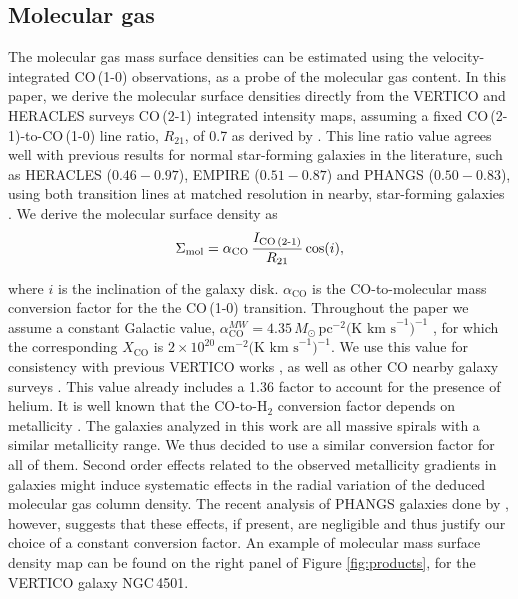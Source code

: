 \documentclass[longauth]{aa}
\begin{document}
\subsection{Molecular gas}
\label{sec:molgas}
The molecular gas mass surface densities can be estimated using the velocity-integrated CO\,(1-0) observations, as a probe of the molecular gas content. In this paper, we derive the molecular surface densities directly from the VERTICO and HERACLES surveys CO\,(2-1) integrated intensity maps, assuming a fixed CO\,(2-1)-to-CO\,(1-0) line ratio, $R_{21}$, of 0.7 as derived by \citet{Brown2021}. This line ratio value agrees well with previous results for normal star-forming galaxies in the literature, such as HERACLES ($0.46-0.97$), EMPIRE ($0.51-0.87$) and PHANGS ($0.50-0.83$), using both transition lines at matched resolution in nearby, star-forming galaxies \citep[e.g.,][]{Leroy2013, JimenezDonaire2019,denBrok2021,Leroy2021c}. We derive the molecular surface density as
\begin{equation}
    \Sigma_{\textrm{mol}}=\alpha_{\textrm{CO}}\,\frac{I_{\textrm{CO\,(2-1)}}}{R_{21}}\,\textrm{cos}(i),
\end{equation}

\noindent where $i$ is the inclination of the galaxy disk. $\alpha_{\textrm{CO}}$ is the CO-to-molecular mass conversion factor for the the CO\,(1-0) transition. Throughout the paper we assume a constant Galactic value, $\alpha^{MW}_{\textrm{CO}}=4.35\,M_\odot\,\textrm{pc}^{-2}\textrm{(K km s}^{-1}\textrm{)}^{-1}$ \citep[see][for a detailed description of its derivation]{Bolatto2013}, for which the corresponding $X_\mathrm{CO}$ is $2\times10^{20}\,\textrm{cm}^{-2}\textrm{(K km s}^{-1}\textrm{)}^{-1}$. We use this value for consistency with previous VERTICO works \citep{Brown2021,Zabel2022}, as well as other CO nearby galaxy surveys \citep[e.g.,][but see Table \ref{tab:previous_results} for an overview]{Leroy2009,Wilson2009,Saintonge2011,Bolatto2017}. This value already includes a 1.36 factor to account for the presence of helium. It is well known that the CO-to-H$_2$ conversion factor depends on metallicity \citep{Wilson1995,Boselli2002,Bolatto2013,Sandstrom2013}.
The galaxies analyzed in this work are all massive spirals with a similar metallicity range. We thus decided to use a similar conversion factor for all of them. 
Second order effects related to the observed metallicity gradients in galaxies might induce systematic effects in the radial variation of the deduced molecular
gas column density. The recent analysis of PHANGS galaxies done by \citet{Pessa2021}, however, suggests that these effects, if present, are negligible and thus justify our 
choice of a constant conversion factor. An example of molecular mass surface density map can be found on the right panel of Figure \ref{fig:products}, for the VERTICO galaxy NGC\,4501.
\end{document}
